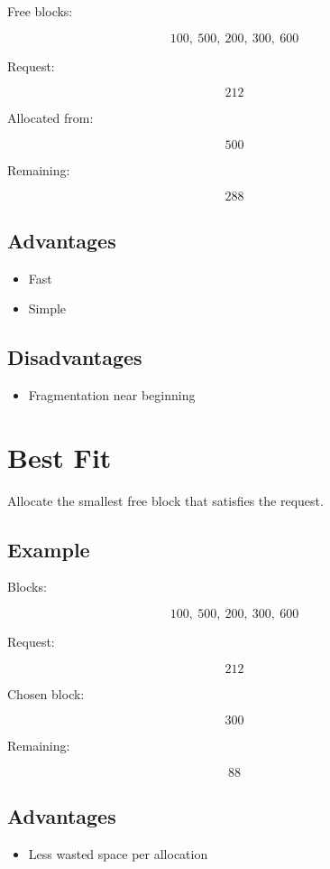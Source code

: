 Free blocks:

\[
100,\ 500,\ 200,\ 300,\ 600
\]

Request:

\[
212
\]

Allocated from:

\[
500
\]

Remaining:

\[
288
\]

\subsection{Advantages}

\begin{itemize}
\item Fast
\item Simple
\end{itemize}

\subsection{Disadvantages}

\begin{itemize}
\item Fragmentation near beginning
\end{itemize}

\section{Best Fit}

Allocate the smallest free block that satisfies the request.

\subsection{Example}

Blocks:

\[
100,\ 500,\ 200,\ 300,\ 600
\]

Request:

\[
212
\]

Chosen block:

\[
300
\]

Remaining:

\[
88
\]

\subsection{Advantages}

\begin{itemize}
\item Less wasted space per allocation
\end{itemize}

